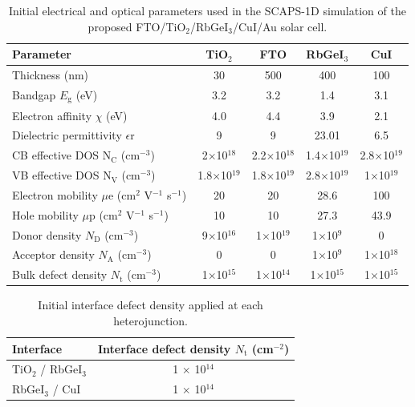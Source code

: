 \documentclass[review]{elsarticle}
\begin{document}
\begin{table}[htbp]
\centering
{\footnotesize\setlength{\tabcolsep}{3pt}
\begin{tabularx}{\textwidth}{Xcccc}
\hline
Parameter & TiO$_{2}$ & FTO & RbGeI$_{3}$ & CuI
\\\hline
Thickness (nm) & 30 & 500 & 400 & 100\\
Bandgap $E_{\mathrm{g}}$ (eV) & 3.2 & 3.2 & 1.4 & 3.1\\
Electron affinity $\chi$ (eV) & 4.0 & 4.4 & 3.9 & 2.1\\
Dielectric permittivity $\epsilon$r & 9 & 9 & 23.01 & 6.5\\
CB effective DOS N$_{\mathrm{C}}$ (cm$^{-3}$) & 2$\times$10$^{18}$ & 2.2$\times$10$^{18}$ & 1.4$\times$10$^{19}$ & 2.8$\times$10$^{19}$\\
VB effective DOS N$_{\mathrm{V}}$ (cm$^{-3}$) & 1.8$\times$10$^{19}$ & 1.8$\times$10$^{19}$ & 2.8$\times$10$^{19}$ & 1$\times$10$^{19}$\\
Electron mobility $\mu$e (cm$^{2}$ V$^{-1}$ s$^{-1}$) & 20 & 20 & 28.6 & 100\\
Hole mobility $\mu$p (cm$^{2}$ V$^{-1}$ s$^{-1}$) & 10 & 10 & 27.3 & 43.9\\
Donor density $N_{\mathrm{D}}$ (cm$^{-3}$) & 9$\times$10$^{16}$ & 1$\times$10$^{19}$ & 1$\times$10$^{9}$ & 0\\
Acceptor density $N_{\mathrm{A}}$ (cm$^{-3}$) & 0 & 0 & 1$\times$10$^{9}$ & 1$\times$10$^{18}$\\
Bulk defect density $N_{\mathrm{t}}$ (cm$^{-3}$) & 1$\times$10$^{15}$ & 1$\times$10$^{14}$ & 1$\times$10$^{15}$ & 1$\times$10$^{15}$\\
\hline
\end{tabularx}
}
\caption{Initial electrical and optical parameters used in the SCAPS-1D simulation of the proposed FTO/\allowbreak{}TiO$_{2}$/RbGeI$_{3}$/CuI/\allowbreak{}Au solar cell.}
\end{table}

\begin{table}[htbp]
\centering
{\small\setlength{\tabcolsep}{3pt}
\begin{tabularx}{\textwidth}{Xc}
\hline
Interface & Interface defect density $N_{\mathrm{t}}$ (cm$^{-2}$)
\\\hline
TiO$_{2}$ / RbGeI$_{3}$ & 1 $\times$ 10$^{14}$\\
RbGeI$_{3}$ / CuI & 1 $\times$ 10$^{14}$\\
\hline
\end{tabularx}
}
\caption{Initial interface defect density applied at each heterojunction.}
\end{table}
\end{document}
